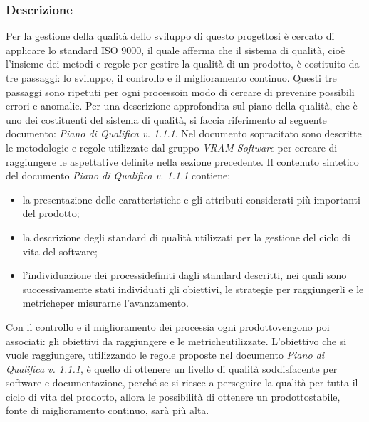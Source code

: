 \subsubsection{Descrizione}
Per la gestione della qualità dello sviluppo di questo progetto\glosp si è cercato di applicare lo standard ISO 9000, il quale afferma che il sistema di qualità, cioè l'insieme dei metodi e regole per gestire la qualità di un prodotto\glo, è costituito da tre passaggi: lo sviluppo, il controllo e il miglioramento continuo. Questi tre passaggi sono ripetuti per ogni processo\glosp in modo di cercare di prevenire possibili errori e anomalie.
Per una descrizione approfondita sul piano della qualità, che è uno dei costituenti del sistema di qualità, si faccia riferimento al seguente documento: \textit{Piano di Qualifica v. 1.1.1}.
Nel documento sopracitato sono descritte le metodologie e regole utilizzate dal gruppo \textit{VRAM Software} per cercare di raggiungere le aspettative definite nella sezione precedente.
Il contenuto sintetico del documento \textit{Piano di Qualifica v. 1.1.1} contiene:
\begin{itemize}
	\item la presentazione delle caratteristiche e gli attributi considerati più importanti del prodotto\glo;
	\item la descrizione degli standard di qualità utilizzati per la gestione del ciclo di vita del software;
	\item l'individuazione dei processi\glosp definiti dagli standard descritti, nei quali sono successivamente stati individuati gli obiettivi, le strategie per raggiungerli e le metriche\glosp per misurarne l'avanzamento.
\end{itemize}
Con il controllo e il miglioramento dei processi\glosp a ogni prodotto\glosp vengono poi associati: gli obiettivi da raggiungere e le metriche\glosp utilizzate.
L'obiettivo che si vuole raggiungere, utilizzando le regole proposte nel documento \textit{Piano di Qualifica v. 1.1.1}, è quello di ottenere un livello di qualità soddisfacente per software e documentazione, perché se si riesce a perseguire la qualità per tutta il ciclo di vita del prodotto\glo, allora le possibilità di ottenere un prodotto\glosp stabile, fonte di miglioramento continuo, sarà più alta.
